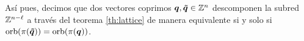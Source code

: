 Así pues, decimos que dos vectores coprimos $\boldsymbol{q}, \boldsymbol{\tilde{q}} \in \mathbb{Z}^n$ descomponen la subred
$\mathbb{Z}^{n-\ell}$ a través del teorema \ref{th:lattice} de manera equivalente si y solo si
$\operatorname{orb}(\pi(\boldsymbol{\tilde{q}})) = \operatorname{orb}(\pi(\boldsymbol{q}))$.


% 
% 
% 
% 
